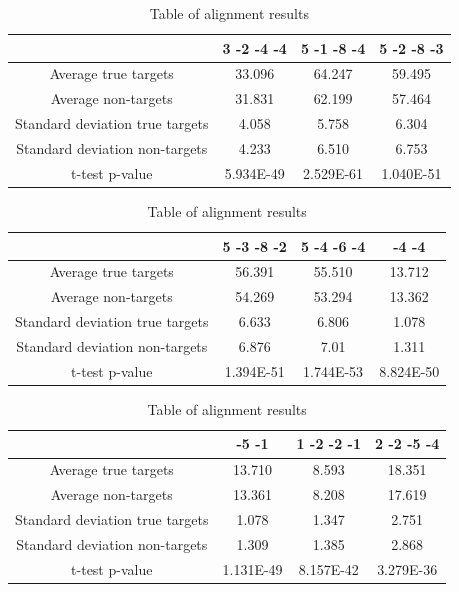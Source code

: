 \documentclass[12pt]{article}
\begin{document}
\begin{table}
\centering
\footnotesize
\caption{Table of alignment results}
\vspace{0.3cm}
\begin{tabular}{c|c|c|c}
& 3 -2 -4 -4 & 5 -1 -8 -4 & 5 -2 -8 -3 \\
\hline\hline
Average true targets & 33.096 & 64.247 & 59.495	\\
Average	non-targets & 31.831 & 62.199 & 57.464 \\
\hline
Standard deviation true targets & 4.058	& 5.758 & 6.304\\
Standard deviation non-targets & 4.233 & 6.510 & 6.753 \\
\hline
t-test p-value & 5.934E-49 & 2.529E-61 & 1.040E-51 \\\hline
\end{tabular}\vspace{0.5cm}

\begin{tabular}{c|c|c|c}
& 5 -3 -8 -2 & 5 -4 -6 -4 & -4 -4 \\
\hline\hline
Average true targets & 56.391 & 55.510 & 13.712 \\
Average	non-targets & 54.269 & 53.294 & 13.362\\
\hline
Standard deviation true targets & 6.633 & 6.806 & 1.078\\
Standard deviation non-targets & 6.876 & 7.01 & 1.311\\
\hline
t-test p-value & 1.394E-51 & 1.744E-53 & 8.824E-50 \\\hline
\end{tabular}\vspace{0.5cm}


\begin{tabular}{c|c|c|c}
 & -5 -1 & 1 -2 -2 -1 & 2 -2 -5 -4  \\
\hline\hline
Average true targets & 13.710 & 8.593 & 18.351\\
Average	non-targets  & 13.361 &	8.208 &	17.619 \\
\hline
Standard deviation true targets & 1.078	& 1.347	& 2.751\\
Standard deviation non-targets & 1.309 & 1.385 & 2.868\\
\hline
t-test p-value & 1.131E-49 & 8.157E-42 & 3.279E-36 \\
\hline
\end{tabular}
\label{table:results}
\end{table}
\end{document}
